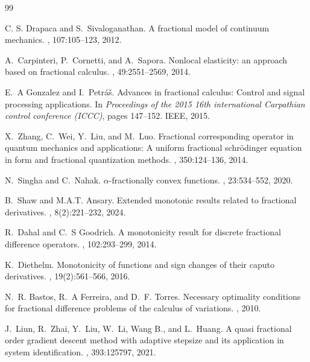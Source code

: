 \documentclass[smallextended,referee,envcountsect]{svjour3}
\begin{document}
%
 \begin{thebibliography}{99} 

C. S. Drapaca and S.~Sivaloganathan.
\newblock A fractional model of continuum mechanics.
, 107:105--123, 2012.

A.~Carpinteri, P.~Cornetti, and A.~Sapora.
\newblock Nonlocal elasticity: an approach based on fractional calculus.
, 49:2551--2569, 2014.

E.~A Gonzalez and I.~Petr{\'a}{\v{s}}.
\newblock Advances in fractional calculus: Control and signal processing applications.
\newblock In {\em Proceedings of the 2015 16th international Carpathian control conference (ICCC)}, pages 147--152. IEEE, 2015.

X.~Zhang, C.~Wei, Y.~Liu, and M.~Luo.
\newblock Fractional corresponding operator in quantum mechanics and applications: A uniform fractional schr{\"o}dinger equation in form and fractional quantization methods.
, 350:124--136, 2014.

N.~Singha and C.~Nahak.
\newblock $\alpha$-fractionally convex functions.
, 23:534--552, 2020.

B.~Shaw and M.A.T. Ansary.
\newblock Extended monotonic results related to fractional derivatives.
, 8(2):221--232, 2024.

R.~Dahal and C.~S Goodrich.
\newblock A monotonicity result for discrete fractional difference operators.
, 102:293--299, 2014.

K.~Diethelm.
\newblock Monotonicity of functions and sign changes of their caputo derivatives.
, 19(2):561--566, 2016.

N.~R. Bastos, R.~A Ferreira, and D.~F. Torres.
\newblock Necessary optimality conditions for fractional difference problems of the calculus of variations.
, 2010.

J.~Liun, R.~Zhai, Y.~Liu, W.~Li, Wang B., and L.~Huang.
\newblock A quasi fractional order gradient descent method with adaptive stepsize and its application in system identification.
, 393:125797, 2021.


\end{thebibliography}
\end{document}
